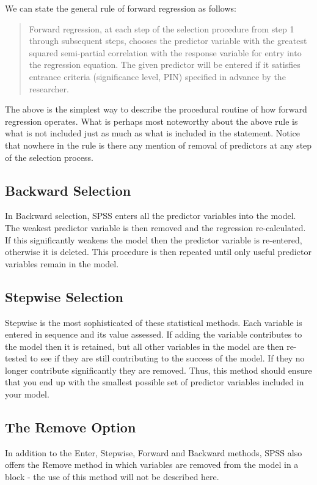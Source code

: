 \documentclass[a4paper,12pt]{article}
\begin{document}
We can state the general rule of forward regression as follows:
\begin{quote}
Forward regression, at each step of the selection procedure from step 1 through subsequent steps, chooses the predictor variable with the greatest squared semi-partial correlation with the response variable for entry into the regression equation. The given predictor will be entered if it satisfies entrance criteria (significance level, PIN) specified in advance by the researcher.
\end{quote}

The above is the simplest way to describe the procedural routine of how forward regression operates. What is perhaps most noteworthy about the above rule is what is not included just as much as what is included in the statement. Notice that nowhere in the rule is there any mention of removal of predictors at any step of the selection process. 

\subsection{Backward Selection}
In Backward selection, SPSS enters all the predictor variables into the model. The weakest predictor variable is then removed and the regression re-calculated. If this significantly weakens the model then the predictor variable is re-entered, otherwise it is deleted. This procedure is then repeated until only useful predictor variables remain in the model.

\subsection{Stepwise Selection}
Stepwise is the most sophisticated of these statistical methods. Each variable is entered in sequence and its value assessed. If adding the variable contributes to the model then it is retained, but all other variables in the model are then re-tested to see if they are still contributing to the success of the model. If they no longer contribute significantly they are removed. Thus, this method should ensure that you end up with the smallest possible set of predictor variables included in your model.

\subsection{The Remove Option}
In addition to the Enter, Stepwise, Forward and Backward methods, SPSS also offers the Remove method in which variables are removed from the model in a block - the use of this method will not be described here.
\end{document}
